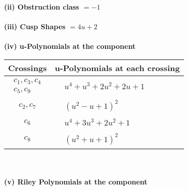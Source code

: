 \documentclass[1p]{elsarticle_modified}
\theoremstyle{definition}
\begin{document}
\flushleft \textbf{(ii) Obstruction class $= -1$}\\~\\
\flushleft \textbf{(iii) Cusp Shapes $= 4 u+2$}\\~\\
\newpage\renewcommand{\arraystretch}{1}
\flushleft \textbf{(iv) u-Polynomials at the component}\newline \\
\begin{tabular}{m{50pt}|m{274pt}}
Crossings & \hspace{64pt}u-Polynomials at each crossing \\
\hline $$\begin{aligned}c_{1},c_{3},c_{4}\\c_{5},c_{9}\end{aligned}$$&$\begin{aligned}
&u^4+u^3+2 u^2+2 u+1
\end{aligned}$\\
\hline $$\begin{aligned}c_{2},c_{7}\end{aligned}$$&$\begin{aligned}
&(u^2- u+1)^2
\end{aligned}$\\
\hline $$\begin{aligned}c_{6}\end{aligned}$$&$\begin{aligned}
&u^4+3 u^3+2 u^2+1
\end{aligned}$\\
\hline $$\begin{aligned}c_{8}\end{aligned}$$&$\begin{aligned}
&(u^2+u+1)^2
\end{aligned}$\\
\hline
\end{tabular}\\~\\
\newpage\renewcommand{\arraystretch}{1}
\flushleft \textbf{(v) Riley Polynomials at the component}\newline \\
\end{document}
